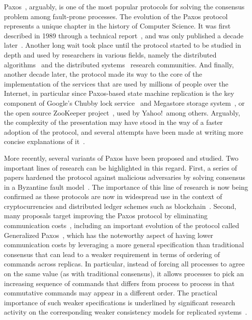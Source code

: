 Paxos~\cite{Lam98}, arguably, is one of the most popular protocols for solving the consensus problem among fault-prone processes. The evolution of the Paxos protocol represents a unique chapter in the history of Computer Science. It was first described in 1989 through a technical report~\cite{paxos:tr}, and was only published a decade later~\cite{Lam98}. Another long wait took place until the protocol started to be studied in depth and used by researchers in various fields, namely the distributed algorithms~\cite{DPLL97} and the distributed systems~\cite{petal} research communities. And finally, another decade later, the protocol made its way to the core of the implementation of the services that are used by millions of people over the Internet, in particular since Paxos-based state machine replication is the key component of Google's Chubby lock service~\cite{chubby} and Megastore storage system~\cite{36971}, or the open source ZooKeeper project~\cite{zookeeper}, used by Yahoo!\ among others. Arguably, the complexity of the presentation may have stood in the way of a faster
adoption of the protocol, and several attempts have been made at writing more concise explanations of it~\cite{L01,Renesse2011}.\par

More recently, several variants of Paxos have been proposed and studied. Two important lines of research can be highlighted in this regard. First, a series of papers hardened the protocol against malicious adversaries by solving consensus in a Byzantine fault
model~\cite{Martin2006,Lamport2011}. The importance of this line of research is now being confirmed as these protocols are now in widespread use in the context of cryptocurrencies and distributed ledger schemes such as blockchain~\cite{bitcoin}. Second, many proposals target improving the Paxos protocol by eliminating communication costs~\cite{L06}, including an important evolution of the protocol called Generalized
Paxos~\cite{Lamport2005}, which has the noteworthy aspect of having lower communication costs by leveraging a more general specification than traditional consensus 
that can lead to a weaker requirement in terms of ordering of commands across replicas. In particular, instead of forcing all processes to agree on the same value (as with traditional consensus), it allows processes to pick an increasing sequence of commands that differs from process to process in that commutative commands may appear in a different order. The practical importance of such weaker specifications is underlined
by significant research activity on the corresponding weaker consistency models for replicated systems~\cite{LLS90,dynamo}.\par


